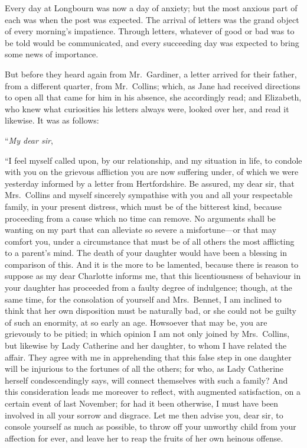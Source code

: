 Every day at Longbourn was now a day of anxiety; but the most
anxious part of each was when the post was expected.  The
arrival of letters was the grand object of every morning's
impatience.  Through letters, whatever of good or bad was to
be told would be communicated, and every succeeding day was
expected to bring some news of importance.

But before they heard again from Mr.\ Gardiner, a letter arrived
for their father, from a different quarter, from Mr.\ Collins;
which, as Jane had received directions to open all that came for
him in his absence, she accordingly read; and Elizabeth, who
knew what curiosities his letters always were, looked over her,
and read it likewise.  It was as follows:

\bigskip
``\emph{My dear sir},
\medskip

``I feel myself called upon, by our relationship, and my situation
in life, to condole with you on the grievous affliction you are now
suffering under, of which we were yesterday informed by a letter
from Hertfordshire.  Be assured, my dear sir, that Mrs.\ Collins
and myself sincerely sympathise with you and all your respectable
family, in your present distress, which must be of the bitterest
kind, because proceeding from a cause which no time can remove.
No arguments shall be wanting on my part that can alleviate so
severe a misfortune---or that may comfort you, under a circumstance
that must be of all others the most afflicting to a parent's mind.
The death of your daughter would have been a blessing in comparison
of this.  And it is the more to be lamented, because there is
reason to suppose as my dear Charlotte informs me, that this
licentiousness of behaviour in your daughter has proceeded from
a faulty degree of indulgence; though, at the same time, for the
consolation of yourself and Mrs.\ Bennet, I am inclined to think
that her own disposition must be naturally bad, or she could not
be guilty of such an enormity, at so early an age.  Howsoever that
may be, you are grievously to be pitied; in which opinion I am not
only joined by Mrs.\ Collins, but likewise by Lady Catherine and
her daughter, to whom I have related the affair.  They agree with
me in apprehending that this false step in one daughter will be
injurious to the fortunes of all the others; for who, as Lady
Catherine herself condescendingly says, will connect themselves
with such a family?  And this consideration leads me moreover
to reflect, with augmented satisfaction, on a certain event
of last November; for had it been otherwise, I must have been
involved in all your sorrow and disgrace.  Let me then advise you,
dear sir, to console yourself as much as possible, to throw off
your unworthy child from your affection for ever, and leave her
to reap the fruits of her own heinous offense.

